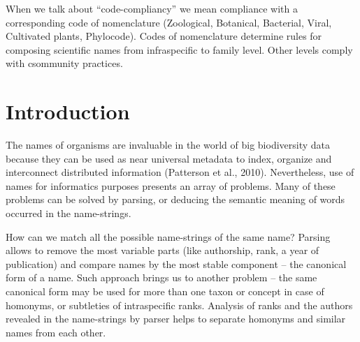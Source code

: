 \documentclass{bmcart}
\begin{document}
When we talk about ``code-compliancy'' we mean compliance with a corresponding
code of nomenclature (Zoological\cite{ICZN}, Botanical\cite{ICN},
Bacterial\cite{ICNB}, Viral\cite{ICTV}, Cultivated plants\cite{ICNCP},
Phylocode\cite{ICPN}). Codes of nomenclature determine rules for composing
scientific names from infraspecific to family level. Other levels comply with
csommunity practices.

\section*{Introduction}

The names of organisms are invaluable in the world of big biodiversity data
because they can be used as near universal metadata to index, organize and
interconnect distributed information (Patterson et al., 2010). Nevertheless,
use of names for informatics purposes presents an array of problems. Many of
these problems can be solved by parsing, or deducing the semantic meaning of
words occurred in the name-strings.

How can we match all the possible name-strings of the same name? Parsing allows
to remove the most variable parts (like authorship, rank, a year of
publication) and compare names by the most stable component -- the canonical
form of a name. Such approach brings us to another problem -- the same
canonical form may be used for more than one taxon or concept in case of
homonyms, or subtleties of intraspecific ranks. Analysis of ranks and the
authors revealed in the name-strings by parser helps to separate homonyms and
similar names from each  other.
\end{document}

